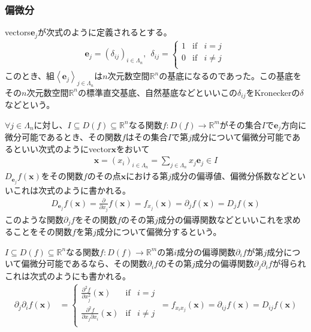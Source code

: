 \documentclass[dvipdfmx]{jsarticle}
\begin{document}
\subsubsection{偏微分}%
\begin{dfn} vectors$\mathbf{e}_{j}$が次式のように定義されるとする。
\begin{align*}
\mathbf{e}_{j} = \left( \delta_{ij} \right)_{i \in \varLambda_{n}} ,\ \ \delta_{ij} =\left\{ \begin{matrix}
1 & \mathrm{if} & i = j \\
0 & \mathrm{if} & i \neq j \\
\end{matrix} \right.\  
\end{align*}
このとき、組$\left\langle \mathbf{e}_{j} \right\rangle_{j \in \varLambda_{n}}$は$n$次元数空間$\mathbb{R}^{n}$の基底になるのであった。この基底をその$n$次元数空間$\mathbb{R}^{n}$の標準直交基底、自然基底などといいこの$\delta_{ij}$をKroneckerの$\delta$などという。
\end{dfn}
\begin{dfn}
$\forall j \in \varLambda_{n}$に対し、$I \subseteq D(f) \subseteq \mathbb{R}^{n}$なる関数$f:D(f) \rightarrow \mathbb{R}^{m}$がその集合$I$で$\mathbf{e}_{j}$方向に微分可能であるとき、その関数$f$はその集合$I$で第$j$成分について偏微分可能であるといい次式のようにvector$\mathbf{x}$をおいて
\begin{align*}
\mathbf{x} = \left( x_{i} \right)_{i \in \varLambda_{n}} = \sum_{j \in \varLambda_{n}} {x_{j}\mathbf{e}_{j}} \in I
\end{align*}
$D_{\mathbf{e}_{j}}f\left( \mathbf{x} \right)$をその関数$f$のその点$\mathbf{x}$における第$j$成分の偏導値、偏微分係数などといいこれは次式のように書かれる。
\begin{align*}
D_{\mathbf{e}_{j}}f\left( \mathbf{x} \right) = \frac{\partial}{\partial x_{j}}f\left( \mathbf{x} \right) = f_{x_{j}}\left( \mathbf{x} \right) = \partial_{j}f\left( \mathbf{x} \right) = D_{j}f\left( \mathbf{x} \right)
\end{align*}
このような関数$\partial_{j}f$をその関数$f$のその第$j$成分の偏導関数などといいこれを求めることをその関数$f$を第$j$成分について偏微分するという。
\end{dfn}
\begin{dfn}
$I \subseteq D(f) \subseteq \mathbb{R}^{n}$なる関数$f:D(f) \rightarrow \mathbb{R}^{m}$の第$i$成分の偏導関数$\partial_{i}f$が第$j$成分について偏微分可能であるなら、その関数$\partial_{i}f$のその第$j$成分の偏導関数$\partial_{j}\partial_{i}f$が得られこれは次式のようにも書かれる。
\begin{align*}
\partial_{j}\partial_{i}f\left( \mathbf{x} \right) &= \left\{ \begin{matrix}
\frac{\partial^{2}f}{\partial x_{j}^{2}}\left( \mathbf{x} \right) & \mathrm{if} & i = j \\
\frac{\partial^{2}f}{\partial x_{j}\partial x_{i}}\left( \mathbf{x} \right) & \mathrm{if} & i \neq j \\
\end{matrix} \right.\  = f_{x_{i}x_{j}}\left( \mathbf{x} \right) = \partial_{ij}f\left( \mathbf{x} \right) = D_{ij}f\left( \mathbf{x} \right)
\end{align*}
\end{dfn}
\end{document}
